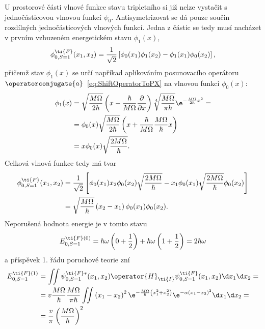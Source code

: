 \begin{solution}
	U prostorové části vlnové funkce stavu tripletního si již nelze vystačit s jednočásticovou vlnovou funkcí $\psi_{0}$.
	Antisymetrizovat se dá pouze součin rozdílných jednočásticových vlnových funkcí.
    Jedna z částic se tedy musí nacházet v prvním vzbuzeném energetickém stavu $\phi_{1}(x)$,
	\begin{equation}
		\phi^{\ti{F}}_{0,S=1}(x_{1},x_{2})
			=\frac{1}{\sqrt{2}}\left[\phi_{0}(x_{1})\phi_{1}(x_{2})-\phi_{1}(x_{1})\phi_{0}(x_{2})\right],
	\end{equation}
	přičemž stav $\phi_{1}(x)$ se určí napříkad aplikováním posunovacího operátoru $\operatorconjugate{a}$~\eqref{eq:ShiftOperatorToPX} na vlnovou funkci $\phi_{0}(x)$:
	\begin{align}
		\phi_{1}(x)
			&=\sqrt{\frac{M\Omega}{2\hbar}}\left(x-\frac{\hbar}{M\Omega}\frac{\partial}{\partial x}\right)
				\sqrt[4]{\frac{M\Omega}{\pi\hbar}}\e^{-\frac{M\Omega}{2\hbar}x^{2}}=\nonumber\\
			&=\phi_{0}(x)\sqrt{\frac{M\Omega}{2\hbar}}\left(x+\frac{\hbar}{M\Omega}\frac{M\Omega}{\hbar}x\right)\nonumber\\
			&=x\phi_{0}(x)\sqrt{\frac{2M\Omega}{\hbar}}.
	\end{align}
	Celková vlnová funkce tedy má tvar
	\begin{align}
		\phi^{\ti{F}}_{0,S=1}(x_{1},x_{2})
			&=\frac{1}{\sqrt{2}}\left[\phi_{0}(x_{1})x_{2}\phi_{0}(x_{2})\sqrt{\frac{2M\Omega}{\hbar}}-x_{1}\phi_{0}(x_{1})\sqrt{\frac{2M\Omega}{\hbar}}\phi_{0}(x_{2})\right]\nonumber\\
			&=\sqrt{\frac{M\Omega}{\hbar}}\left(x_{2}-x_{1}\right)\phi_{0}(x_{1})\phi_{0}(x_{2}).
	\end{align}
	Neporušená hodnota energie je v tomto stavu
	\begin{equation}
		E_{0,S=1}^{\ti{F}(0)}
			=\hbar\omega\left(0+\frac{1}{2}\right)+\hbar\omega\left(1+\frac{1}{2}\right)
			=2\hbar\omega
	\end{equation}
	a příspěvek 1. řádu poruchové teorie zní
	\begin{align}
		E_{0,S=1}^{\ti{F}(1)}
			&=\iint\psi^{\ti{F}*}_{0,S=1}(x_{1},x_{2})\operator{H}_{\ti{I}}\psi_{0,S=1}^{\ti{F}}(x_{1},x_{2})\d x_{1}\d x_{2}=\nonumber\\
			&=v\frac{M\Omega}{\hbar}\frac{M\Omega}{\pi\hbar}
				\iint\left(x_{1}-x_{2}\right)^{2}\e^{-\frac{M\Omega}{\hbar}\left(x_{1}^{2}+x_{2}^{2}\right)}
				\e^{-\alpha\left(x_{1}-x_{2}\right)^{2}}\d x_{1}\d x_{2}=\nonumber\\
			&=\frac{v}{\pi}\left(\frac{M\Omega}{\hbar}\right)^{2}

\end{align}
\end{solution}
